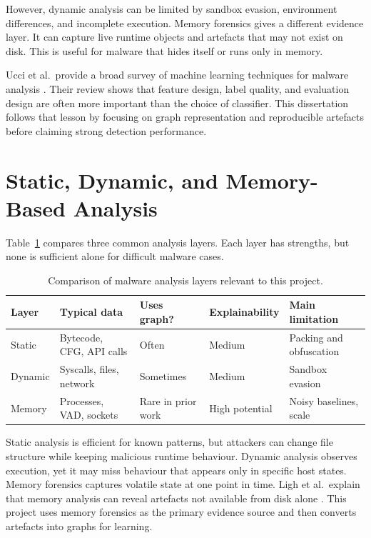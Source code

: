 However, dynamic analysis can be limited by sandbox evasion, environment differences, and incomplete execution. Memory forensics gives a different evidence layer. It can capture live runtime objects and artefacts that may not exist on disk. This is useful for malware that hides itself or runs only in memory.

Ucci et al.\ provide a broad survey of machine learning techniques for malware analysis \cite{ucci2019survey}. Their review shows that feature design, label quality, and evaluation design are often more important than the choice of classifier. This dissertation follows that lesson by focusing on graph representation and reproducible artefacts before claiming strong detection performance.

\section{Static, Dynamic, and Memory-Based Analysis}

Table~\ref{tab:analysis_comparison} compares three common analysis layers. Each layer has strengths, but none is sufficient alone for difficult malware cases.

\begin{table}[htbp]
\centering
\caption{Comparison of malware analysis layers relevant to this project.}
\label{tab:analysis_comparison}
\begin{tabular}{p{2.2cm}p{3.2cm}p{2cm}p{2.2cm}p{3.2cm}}
\toprule
\textbf{Layer} & \textbf{Typical data} & \textbf{Uses graph?} & \textbf{Explainability} & \textbf{Main limitation} \\
\midrule
Static & Bytecode, CFG, API calls & Often & Medium & Packing and obfuscation \\
Dynamic & Syscalls, files, network & Sometimes & Medium & Sandbox evasion \\
Memory & Processes, VAD, sockets & Rare in prior work & High potential & Noisy baselines, scale \\
\bottomrule
\end{tabular}
\end{table}

Static analysis is efficient for known patterns, but attackers can change file structure while keeping malicious runtime behaviour. Dynamic analysis observes execution, yet it may miss behaviour that appears only in specific host states. Memory forensics captures volatile state at one point in time. Ligh et al.\ explain that memory analysis can reveal artefacts not available from disk alone \cite{ligh2014art}. This project uses memory forensics as the primary evidence source and then converts artefacts into graphs for learning.

